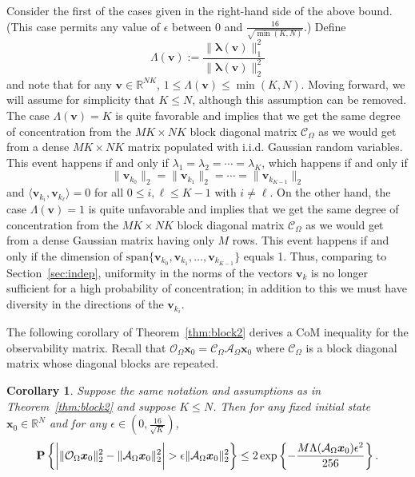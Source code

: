 \documentclass[11pt,draftcls,onecolumn]{IEEEtran}
\def\real    { \mathbb{R} }
\newtheorem{cor}{Corollary}
\newcommand{\eps}{\epsilon}
\newcommand{\norm}[1]{\| #1 \|}
\newcommand{\Prob}[1]{{\bf P}\left\{#1\right\}}
\def \ok {{\mathcal{O}_{\Omega}}}
\def \ck {{\mathcal{C}_{\Omega}}}
\def \ak {{\mathcal{A}_{\Omega}}}
\newcommand{\vc}[1]{\boldsymbol{#1}}
\def\real    { \mathbb{R} }
\begin{document}
Consider the first of the cases given in the right-hand side of the above bound. (This case permits any value of $\epsilon$ between $0$ and $\frac{16}{\sqrt{\min(K,N)}}$.) Define
\begin{equation}
\Lambda\left(\vc{v}\right) := \frac{\|
\vc{\lambda}\left(\vc{v}\right)\|_1^2}{\norm{\vc{\lambda}\left(\vc{v}\right)}^2_2}
\label{eq:Lambda2}
\end{equation}
and note that for any $\vc{v} \in
\real^{NK}$, $ 1 \le \Lambda\left(\vc{v}\right) \le \min(K,N)$. Moving forward, we will assume for simplicity that $K \le N$, although this assumption can be removed.
The case $\Lambda\left(\vc{v}\right) = K$ is quite favorable and implies that we get the same degree of concentration from the $MK \times NK$
block diagonal matrix $\ck$ as we would get from a dense $MK \times NK$ matrix populated with \ac{i.i.d.} Gaussian random variables. This event happens if and only if $\lambda_1 = \lambda_2 = \cdots = \lambda_K$, which happens if and only if
$$
\|\vc{v}_{k_0}\|_2 = \|\vc{v}_{k_1}\|_2 = \cdots = \|\vc{v}_{k_{K-1}}\|_2
$$
and $\langle \vc{v}_{k_i}, \vc{v}_{k_\ell} \rangle = 0$ for all $0 \le i,\ell \le K-1$ with $i \neq \ell$.
On the other hand, the case  $\Lambda\left(\vc{v}\right) = 1$ is quite unfavorable and implies that we get the same degree of concentration from the $MK \times NK$ block diagonal matrix $\ck$ as we would get from a dense Gaussian matrix having only $M$ rows.
This event happens if and only if the dimension of $\mathrm{span}\{\vc{v}_{k_0}, \vc{v}_{k_1}, \dots, \vc{v}_{k_{K-1}} \}$ equals 1. Thus, comparing to Section~\ref{sec:indep}, uniformity in the norms of the vectors $\vc{v}_k$ is no longer sufficient for a high probability of concentration; in addition to this we must have diversity in the directions of the $\vc{v}_{k_i}$.

The following corollary of Theorem~\ref{thm:block2} derives
a \ac{CoM} inequality for the observability matrix. Recall that $\ok \vc{x}_0 = \ck \ak \vc{x}_0$ where $\ck$ is a block diagonal matrix whose diagonal blocks are repeated.

\begin{cor} Suppose the same notation and assumptions as in Theorem~\ref{thm:block2} and suppose $K \le N$. Then for any fixed initial state $\vc{x}_0 \in \real^N$ and for any $\eps \in (0,\frac{16}{\sqrt{K}})$,
\begin{equation}
\Prob{\bigg{|}\|\ok \vc{x}_0 \|_{2}^{2}-\|\ak \vc{x}_0\|_2^2\bigg{|}> \epsilon\|\ak \vc{x}_0\|_{2}^{2}}
\leq
2\exp\left\{-\frac{M \Lambda(\ak \vc{x}_0) \epsilon^{2}}{256}\right\}.
\label{eq:conc4}
\end{equation}
\end{cor}
\end{document}
